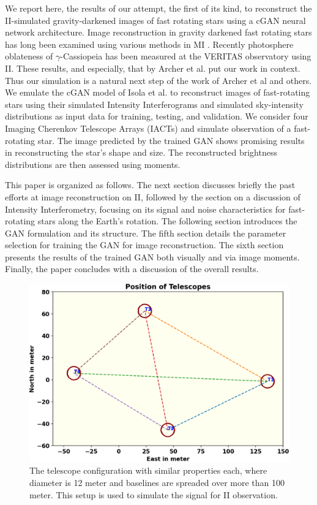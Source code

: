 We report here, the results of our attempt, the first of its kind, to reconstruct the II-simulated gravity-darkened images of fast rotating stars using a cGAN neural network architecture. Image reconstruction in gravity darkened fast rotating stars has long been examined using various methods in MI \citep{vanBelle2001, DomicianodeSouza2003, DomicianodeSouza2005, Monnier2007, Pedretti2009, Zhao2009, Martinez2021}. Recently photosphere oblateness of $\gamma$-Cassiopeia \citep{2025arXiv250615027A} has been measured at the VERITAS observatory using II. These results, and especially, that by Archer et al. \cite{2025arXiv250615027A}  put our work in context. Thus our simulation is a natural next step of the work of Archer et al and others. We emulate the cGAN model of Isola et al. \cite{isola2017image} to reconstruct images of fast-rotating stars using their simulated Intensity Interferograms and simulated sky-intensity distributions as input data for training, testing, and validation. We consider four Imaging Cherenkov Telescope Arrays (IACTs) and simulate observation of a fast-rotating star. The image predicted by the trained GAN shows promising results in reconstructing the star’s shape and size. The reconstructed brightness distributions are then assessed using moments.

This paper is organized as follows. The next section discusses briefly the past efforts at image reconstruction on II, followed by the section on a discussion of Intensity Interferometry, focusing on its signal and noise characteristics for fast-rotating stars along the Earth’s rotation. The following section introduces the GAN formulation and its structure. The fifth section details the parameter selection for training the GAN for image reconstruction. The sixth section presents the results of the trained GAN both visually and via image moments. Finally, the paper concludes with a discussion of the overall results.
\begin{figure}
	\centering
	\includegraphics[width=\linewidth]{fig/telescope.png}
	\caption{The telescope configuration with similar properties each, where diameter is 12 meter and baselines are spreaded over more than 100 meter. This setup is used to simulate the signal for II observation.}
	\label{fig:teles}
\end{figure}